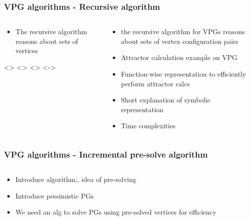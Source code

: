 \documentclass[aspectratio=169]{beamer}
\newcounter{picite}
\begin{document}
\begin{frame}[t]
\frametitle{VPG algorithms - Recursive algorithm}
\begin{columns}[t]
	\begin{column}{0.5\textwidth}
		\begin{itemize}
			\item The recursive algorithm reasons about sets of vertices
		\end{itemize}
		\def\highlighteda{0}%
		\def\highlightedb{0}%
		\def\highlightedc{0}%
		\def\highlightedd{1}%
		\def\highlightede{0}%
		\def\highlightedf{0}%
		\def\highlightedg{0}%
		\def\highlightedh{1}%
		
		\setcounter{picite}{0}%
		\only<\thepicite>{}\pause%
		\def\highlightede{1}%
		\def\highlightedc{1}%
		\only<\thepicite>{}\pause%
		\def\highlightedf{1}%
		\only<\thepicite>{}\pause%
		\def\highlightedg{1}%
		\only<\thepicite->{}\pause%
	\end{column}
	\begin{column}{0.5\textwidth}
		\begin{itemize}
			\item the recursive algorithm for VPGs reasons about sets of vertex configuration pairs
			\item Attractor calculation example on VPG
			\item Function-wise representation to efficiently perform attractor calcs
			\item Short explanation of symbolic representation
			\item Time complexities
		\end{itemize}
	\end{column}
\end{columns}
\end{frame}


\begin{frame}[t]
\frametitle{VPG algorithms - Incremental pre-solve algorithm}
\begin{columns}[t]
	\begin{column}{0.5\textwidth}
		\begin{itemize}
			\item Introduce algorithm;, idea of pre-solving
			\item Introduce pessimistic PGs
			\item We need an alg to solve PGs using pre-solved vertices for efficiency
		\end{itemize}
	\end{column}
	\begin{column}{0.5\textwidth}
	\end{column}
\end{columns}
\end{frame}
\end{document}
